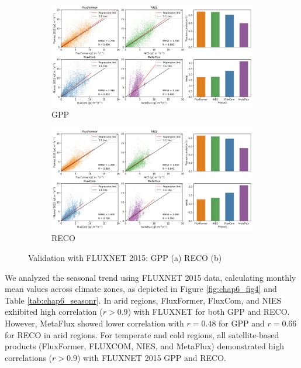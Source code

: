 \begin{figure}[p]
    \centering
    \begin{subfigure}{\textwidth}
      \centering
      \includegraphics[width=.8\textwidth]{figs/chap6/val_fluxnet_all_GPP.jpg}
      \caption{GPP}
      \label{fig:chap6_fig3a}
    \end{subfigure}

    \begin{subfigure}{\textwidth}
      \centering
      \includegraphics[width=.8\textwidth]{figs/chap6/val_fluxnet_all_RECO.jpg}
      \caption{RECO}
      \label{fig:chap6_fig3b}
    \end{subfigure}
    \caption[Validation with FLUXNET 2015]{Validation with FLUXNET 2015: GPP (a) RECO (b)}
    \label{fig:chap6_fig3}
\end{figure}
We analyzed the seasonal trend using FLUXNET 2015 data, calculating monthly mean values across climate zones, as depicted in Figure \ref{fig:chap6_fig4} and Table \ref{tab:chap6_seasonr}. In arid regions, FluxFormer, FluxCom, and NIES exhibited high correlation ($r > 0.9$) with FLUXNET for both GPP and RECO. However, MetaFlux showed lower correlation with $r=0.48$ for GPP and $r=0.66$ for RECO in arid regions. For temperate and cold regions, all satellite-based products (FluxFormer, FLUXCOM, NIES, and MetaFlux) demonstrated high correlations ($r>0.9$) with FLUXNET 2015 GPP and RECO. \par


